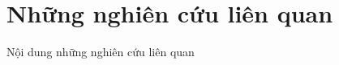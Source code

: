 \chapter{Những nghiên cứu liên quan}\label{chap:nhungnghiencuulienquan}

Nội dung những nghiên cứu liên quan